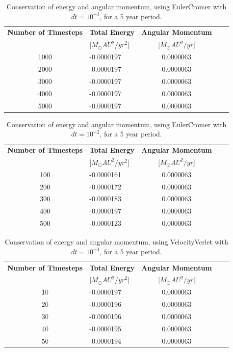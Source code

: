 \documentclass[norsk,a4paper,12pt]{article}
\begin{document}
{\begin{table} [H]
\centering
\caption{Conservation of energy and angular momentum, using EulerCromer with $dt=10^{-3}$, for a 5 year period.}
\begin{tabularx}{\textwidth}{cXcXc} \toprule
    {\bf Number of Timesteps} & {\bf Total Energy }& {\bf Angular Momentum} \\
    &[$M_\odot AU^2/yr^2$]&[$M_\odot AU^2/yr$]\\ \hline
    1000 & -0.0000197 & 0.0000063\\ \hline
    2000 & -0.0000197 & 0.0000063\\ \hline
    3000 & -0.0000197 & 0.0000063\\ \hline
    4000 & -0.0000197 & 0.0000063\\ \hline
    5000 & -0.0000197 & 0.0000063\\ \bottomrule 
\end{tabularx}
\label{euler_dt=10(-3)}
\end{table}

\begin{table} [H]
\centering
\caption{Conservation of energy and angular momentum, using EulerCromer with $dt=10^{-2}$, for a 5 year period.}
\begin{tabularx}{\textwidth}{cXcXc} \toprule
    {\bf Number of Timesteps} & {\bf Total Energy }& {\bf Angular Momentum} \\
    &[$M_\odot AU^2/yr^2$]&[$M_\odot AU^2/yr$]\\ \hline
    100 & -0.0000161 & 0.0000063\\ \hline
    200 & -0.0000172 & 0.0000063\\ \hline
    300 & -0.0000183 & 0.0000063\\ \hline
    400 & -0.0000197 & 0.0000063\\ \hline
    500 & -0.0000123 & 0.0000063\\ \bottomrule 
\end{tabularx}
\label{euler_dt=10(-1)}
\end{table}

\begin{table} [H]
\centering
\caption{Conservation of energy and angular momentum, using VelocityVerlet with $dt=10^{-1}$, for a 5 year period.}
\begin{tabularx}{\textwidth}{cXcXc} \toprule
    {\bf Number of Timesteps} & {\bf Total Energy }& {\bf Angular Momentum} \\
    &[$M_\odot AU^2/yr^2$]&[$M_\odot AU^2/yr$]\\ \hline
    10 & -0.0000197 & 0.0000063\\ \hline
    20 & -0.0000196 & 0.0000063\\ \hline
    30 & -0.0000196 & 0.0000063\\ \hline
    40 & -0.0000195 & 0.0000063\\ \hline
    50 & -0.0000194 & 0.0000063\\ \bottomrule 
\end{tabularx}
\label{verlet_dt=10(-1)}
\end{table}

}
\end{document}
